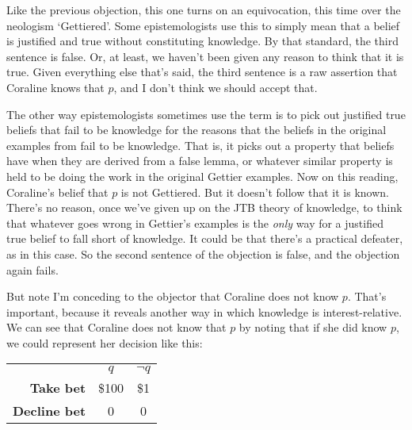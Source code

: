{Like the previous objection, this one turns on an equivocation, this time over the neologism `Gettiered'. Some epistemologists use this to simply mean that a belief is justified and true without constituting knowledge. By that standard, the third sentence is false. Or, at least, we haven't been given any reason to think that it is true. Given everything else that's said, the third sentence is a raw assertion that Coraline knows that \(p\), and I don't think we should accept that.

The other way epistemologists sometimes use the term is to pick out justified true beliefs that fail to be knowledge for the reasons that the beliefs in the original examples from \cite{Gettier1963} fail to be knowledge. That is, it picks out a property that beliefs have when they are derived from a false lemma, or whatever similar property is held to be doing the work in the original Gettier examples. Now on this reading, Coraline's belief that \(p\) is not Gettiered. But it doesn't follow that it is known. There's no reason, once we've given up on the JTB theory of knowledge, to think that whatever goes wrong in Gettier's examples is the \textit{only} way for a justified true belief to fall short of knowledge. It could be that there's a practical defeater, as in this case. So the second sentence of the objection is false, and the objection again fails.

But note I'm conceding to the objector that Coraline does not know $p$. That's important, because it reveals another way in which knowledge is interest-relative. We can see that Coraline does not know that $p$ by noting that if she did know $p$, we could represent her decision like this:

\begin{center}
\begin{tabular}{r c c}
 & \textbf{\(q\)} & \textbf{\( \neg q\)}  \\
\textbf{Take bet} & \$100 & \$1  \\
\textbf{Decline bet} & 0 & 0  \\
\end{tabular}
\end{center}

}
